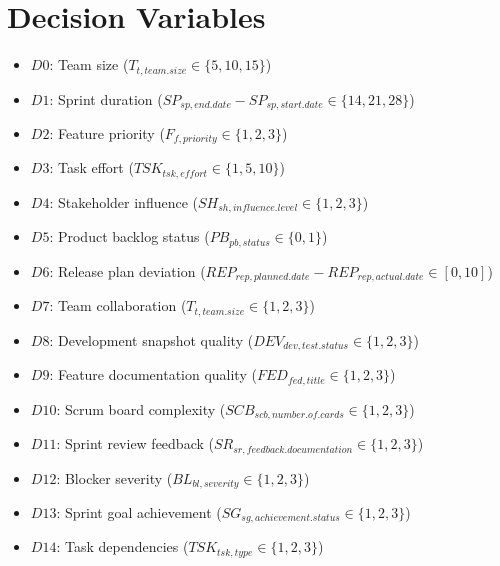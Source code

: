 \documentclass{article}
\begin{document}
\section{Decision Variables}
\begin{itemize}
    \item $D0$: Team size ($T_{t,team.size} \in \{5, 10, 15\}$)
    \item $D1$: Sprint duration ($SP_{sp,end.date} - SP_{sp,start.date} \in \{14, 21, 28\}$)
    \item $D2$: Feature priority ($F_{f,priority} \in \{1, 2, 3\}$)
    \item $D3$: Task effort ($TSK_{tsk,effort} \in \{1, 5, 10\}$)
    \item $D4$: Stakeholder influence ($SH_{sh,influence.level} \in \{1, 2, 3\}$)
    \item $D5$: Product backlog status ($PB_{pb,status} \in \{0, 1\}$)
    \item $D6$: Release plan deviation ($REP_{rep,planned.date} - REP_{rep,actual.date} \in [0, 10]$)
    \item $D7$: Team collaboration ($T_{t,team.size} \in \{1, 2, 3\}$)
    \item $D8$: Development snapshot quality ($DEV_{dev,test.status} \in \{1, 2, 3\}$)
    \item $D9$: Feature documentation quality ($FED_{fed,title} \in \{1, 2, 3\}$)
    \item $D10$: Scrum board complexity ($SCB_{scb,number.of.cards} \in \{1, 2, 3\}$)
    \item $D11$: Sprint review feedback ($SR_{sr,feedback.documentation} \in \{1, 2, 3\}$)
    \item $D12$: Blocker severity ($BL_{bl,severity} \in \{1, 2, 3\}$)
    \item $D13$: Sprint goal achievement ($SG_{sg,achievement.status} \in \{1, 2, 3\}$)
    \item $D14$: Task dependencies ($TSK_{tsk,type} \in \{1, 2, 3\}$)
\end{itemize}
\end{document}

